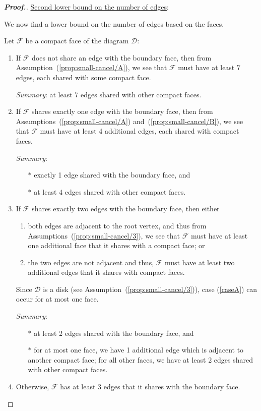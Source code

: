 \documentclass[11pt,a4paper,reqno]{amsart}
\theoremstyle{plain}
\theoremstyle{definition}
\theoremstyle{definition}
\newenvironment{myproof}{\begin{proof}[\normalfont\bfseries Proof.]}{\end{proof}}
\begin{document}
\begin{myproof}
\medskip
\noindent
\underline{Second lower bound on the number of edges}:\nopagebreak

\smallskip\nopagebreak
\noindent\nopagebreak
We now find a lower bound on the number of edges based on the faces.

Let $\mathcal F$ be a compact face of the diagram $\mathcal D$:
\begin{enumerate}[label=(\roman*),ref=\roman*]
  \item
    If $\mathcal F$ does not share an edge with the boundary face, then from Assumption~(\ref{prop:small-cancel/A}), we see that $\mathcal F$ must have at least $7$ edges, each shared with some compact face.

    \smallskip
    \noindent \textit{Summary}: at least 7 edges shared with other compact faces.
    \medskip

  \item
    If $\mathcal F$ shares exactly one edge with the boundary face, then from Assumptions~(\ref{prop:small-cancel/A}) and~(\ref{prop:small-cancel/B}), we see that $\mathcal F$ must have at least 4 additional edges, each shared with compact faces. 

    \smallskip
    \noindent \textit{Summary}: \begin{itemize}\item[$*$] exactly 1 edge shared with the boundary face, and \item[$*$] at least 4 edges shared with other compact faces.\end{itemize}
    \medskip
  \item
    If $\mathcal F$ shares exactly two edges with the boundary face, then either
    \begin{enumerate}[label=(\alph*), ref=\alph*]
      \item\label{caseA} both edges are adjacent to the root vertex, and thus from Assumptions~(\ref{prop:small-cancel/3}), we see that $\mathcal F$ must have at least one additional face that it shares with a compact face; or
      \item the two edges are not adjacent and thus, $\mathcal F$ must have at least two additional edges that it shares with compact faces.
    \end{enumerate}
    \noindent
    Since $\mathcal D$ is a disk (see Assumption~(\ref{prop:small-cancel/3})), case (\ref{caseA}) can occur for at most one face.

    \smallskip
  \noindent \textit{Summary}: \begin{itemize}\item[$*$] at least 2 edges shared with the boundary face, and \item[$*$] for at most one face, we have 1 additional edge which is adjacent to another compact face; for all other faces, we have at least 2 edges shared with other compact faces.\end{itemize}
    \medskip
  \item
    Otherwise, $\mathcal F$ has at least 3 edges that it shares with the boundary face.


\end{enumerate}
\end{myproof}
\end{document}
